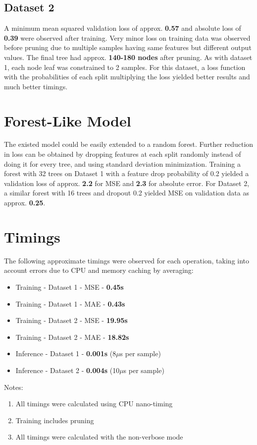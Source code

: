 \documentclass{article}
\begin{document}



\subsection{Dataset 2}
A minimum mean squared validation loss of approx. \textbf{0.57} and absolute loss of \textbf{0.39} were observed after training. Very minor loss on training data was observed before pruning due to multiple samples having same features but different output values. The final tree had approx. \textbf{140-180 nodes} after pruning. As with dataset 1, each node leaf was constrained to 2 samples. For this dataset, a loss function with the probabilities of each split multiplying the loss yielded better results and much better timings.




\newpage

\section{Forest-Like Model}
The existed model could be easily extended to a random forest. Further reduction in loss can be obtained by dropping features at each split randomly instead of doing it for every tree, and using standard deviation minimization. Training a forest with 32 trees on Dataset 1 with a feature drop probability of 0.2 yielded a validation loss of approx. \textbf{2.2} for MSE and \textbf{2.3} for absolute error. For Dataset 2, a similar forest with 16 trees and dropout 0.2 yielded MSE on validation data as approx. \textbf{0.25}.

\vspace{2mm}



\section{Timings}
The following approximate timings were observed for each operation, taking into account errors due to CPU and memory caching by averaging:
\begin{itemize}
	\item Training - Dataset 1 - MSE - \textbf{0.45s}
	\item Training - Dataset 1 - MAE - \textbf{0.43s}
	\item Training - Dataset 2 - MSE - \textbf{19.95s}
	\item Training - Dataset 2 - MAE - \textbf{18.82s}
	\item Inference - Dataset 1 - \textbf{0.001s} (8$\mu$s per sample)
	\item Inference - Dataset 2 - \textbf{0.004s} (10$\mu$s per sample)
\end{itemize}
Notes:
\begin{enumerate}
	\item All timings were calculated using CPU nano-timing
	\item Training includes pruning
	\item All timings were calculated with the non-verbose mode
\end{enumerate}
\end{document}
